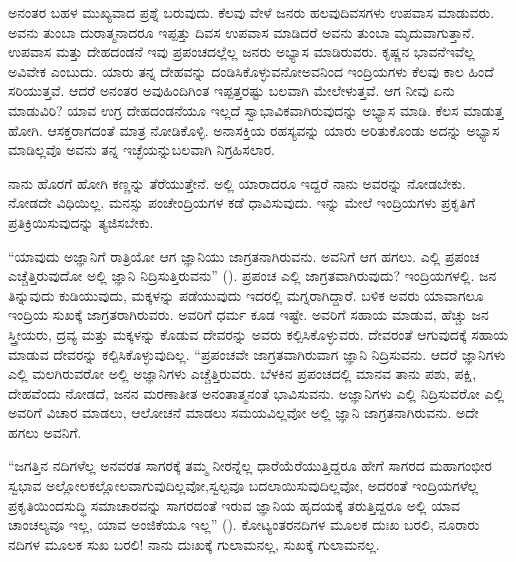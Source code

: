 ಅನಂತರ ಬಹಳ ಮುಖ್ಯವಾದ ಪ್ರಶ್ನೆ ಬರುವುದು. ಕೆಲವು ವೇಳೆ ಜನರು ಹಲವು\break ದಿವಸಗಳು ಉಪವಾಸ ಮಾಡುವರು. ಅವನು ತುಂಬಾ ದುರಾತ್ಮನಾದರೂ ಇಪ್ಪತ್ತು ದಿವಸ ಉಪವಾಸ ಮಾಡಿದರೆ ಅವನು ತುಂಬಾ ಮೃದುವಾಗುತ್ತಾನೆ. ಉಪವಾಸ ಮತ್ತು ದೇಹದಂಡನೆ ಇವು ಪ್ರಪಂಚದಲ್ಲೆಲ್ಲ ಜನರು ಅಭ್ಯಾಸ ಮಾಡಿರುವರು. ಕೃಷ್ಣನ ಭಾವನೆ\break ಇವೆಲ್ಲ ಅವಿವೇಕ ಎಂಬುದು. ಯಾರು ತನ್ನ ದೇಹವನ್ನು ದಂಡಿಸಿಕೊಳ್ಳುವನೋ\break ಅವನಿಂದ ಇಂದ್ರಿಯಗಳು ಕೆಲವು ಕಾಲ ಹಿಂದೆ ಸರಿಯುತ್ತವೆ. ಆದರೆ ಅನಂತರ ಅವು\break ಹಿಂದಿಗಿಂತ ಇಪ್ಪತ್ತರಷ್ಟು ಬಲವಾಗಿ ಮೇಲೇಳುತ್ತವೆ. ಆಗ ನೀವು ಏನು ಮಾಡುವಿರಿ? ಯಾವ ಉಗ್ರ ದೇಹದಂಡನೆಯೂ ಇಲ್ಲದೆ ಸ್ವಾಭಾವಿಕವಾಗಿರುವುದನ್ನು ಅಭ್ಯಾಸ ಮಾಡಿ. ಕೆಲಸ ಮಾಡುತ್ತ ಹೋಗಿ. ಆಸಕ್ತರಾಗದಂತೆ ಮಾತ್ರ ನೋಡಿಕೊಳ್ಳಿ. ಅನಾಸಕ್ತಿಯ ರಹಸ್ಯವನ್ನು ಯಾರು ಅರಿತುಕೊಂಡು ಅದನ್ನು ಅಭ್ಯಾಸ ಮಾಡಿಲ್ಲವೊ ಅವನು ತನ್ನ ಇಚ್ಛೆಯನ್ನು\break ಬಲವಾಗಿ ನಿಗ್ರಹಿಸಲಾರ.

ನಾನು ಹೊರಗೆ ಹೋಗಿ ಕಣ್ಣನ್ನು ತೆರೆಯುತ್ತೇನೆ. ಅಲ್ಲಿ ಯಾರಾದರೂ ಇದ್ದರೆ ನಾನು ಅವರನ್ನು ನೋಡಬೇಕು. ನೋಡದೇ ವಿಧಿಯಿಲ್ಲ. ಮನಸ್ಸು ಪಂಚೇಂದ್ರಿಯಗಳ ಕಡೆ ಧಾವಿಸುವುದು. ಇನ್ನು ಮೇಲೆ ಇಂದ್ರಿಯಗಳು ಪ್ರಕೃತಿಗೆ ಪ್ರತಿಕ್ರಿಯಿಸುವುದನ್ನು ತ್ಯಜಿಸಬೇಕು.

“ಯಾವುದು ಅಜ್ಞಾನಿಗೆ ರಾತ್ರಿಯೋ ಆಗ ಜ್ಞಾನಿಯು ಜಾಗ್ರತನಾಗಿರುವನು. ಅವನಿಗೆ ಆಗ ಹಗಲು. ಎಲ್ಲಿ ಪ್ರಪಂಚ ಎಚ್ಚೆತ್ತಿರುವುದೋ ಅಲ್ಲಿ ಜ್ಞಾನಿ ನಿದ್ರಿಸುತ್ತಿರುವನು” (). ಪ್ರಪಂಚ ಎಲ್ಲಿ ಜಾಗ್ರತವಾಗಿರುವುದು? ಇಂದ್ರಿಯಗಳಲ್ಲಿ. ಜನ ತಿನ್ನುವುದು ಕುಡಿಯುವುದು, ಮಕ್ಕಳನ್ನು ಪಡೆಯುವುದು ಇದರಲ್ಲಿ ಮಗ್ನರಾಗಿದ್ದಾರೆ. ಬಳಿಕ ಅವರು ಯಾವಾಗಲೂ ಇಂದ್ರಿಯ ಸುಖಕ್ಕೆ ಜಾಗ್ರತರಾಗಿರುವರು. ಅವರಿಗೆ ಧರ್ಮ ಕೂಡ ಇಷ್ಟೇ. ಅವರಿಗೆ ಸಹಾಯ ಮಾಡುವ, ಹೆಚ್ಚು ಜನ ಸ್ತ್ರೀಯರು, ದ್ರವ್ಯ ಮತ್ತು ಮಕ್ಕಳನ್ನು ಕೊಡುವ ದೇವರನ್ನು ಅವರು ಕಲ್ಪಿಸಿಕೊಳ್ಳುವರು. ದೇವರಂತೆ ಆಗುವುದಕ್ಕೆ ಸಹಾಯ ಮಾಡುವ ದೇವರನ್ನು ಕಲ್ಪಿಸಿಕೊಳ್ಳುವುದಿಲ್ಲ. “ಪ್ರಪಂಚವೇ ಜಾಗ್ರತವಾಗಿರುವಾಗ ಜ್ಞಾನಿ ನಿದ್ರಿಸುವನು. ಆದರೆ ಜ್ಞಾನಿಗಳು ಎಲ್ಲಿ ಮಲಗಿರುವರೋ ಅಲ್ಲಿ ಅಜ್ಞಾನಿಗಳು ಎಚ್ಚೆತ್ತಿರುವರು. ಬೆಳಕಿನ ಪ್ರಪಂಚದಲ್ಲಿ ಮಾನವ ತಾನು ಪಶು, ಪಕ್ಷಿ, ದೇಹವೆಂದು ನೋಡದೆ, ಜನನ ಮರಣಾತೀತ ಅನಂತಾತ್ಮನಂತೆ ಭಾವಿಸುವನು. ಅಜ್ಞಾನಿಗಳು ಎಲ್ಲಿ ನಿದ್ರಿಸುವರೋ ಎಲ್ಲಿ ಅವರಿಗೆ ವಿಚಾರ ಮಾಡಲು, ಆಲೋಚನೆ ಮಾಡಲು ಸಮಯವಿಲ್ಲವೋ ಅಲ್ಲಿ ಜ್ಞಾನಿ ಜಾಗ್ರತನಾಗಿರುವನು. ಅದೇ ಹಗಲು ಅವನಿಗೆ.

“ಜಗತ್ತಿನ ನದಿಗಳೆಲ್ಲ ಅನವರತ ಸಾಗರಕ್ಕೆ ತಮ್ಮ ನೀರನ್ನೆಲ್ಲ ಧಾರೆಯೆರೆಯುತ್ತಿದ್ದರೂ ಹೇಗೆ ಸಾಗರದ ಮಹಾಗಂಭೀರ ಸ್ವಭಾವ ಅಲ್ಲೋಲಕಲ್ಲೋಲವಾಗುವುದಿಲ್ಲವೋ,\break ಸ್ವಲ್ಪವೂ ಬದಲಾಯಿಸುವುದಿಲ್ಲವೋ, ಅದರಂತೆ ಇಂದ್ರಿಯಗಳೆಲ್ಲ ಪ್ರಕೃತಿಯಿಂದ\break ಸುದ್ಧಿ ಸಮಾಚಾರವನ್ನು ಸಾಗರದಂತೆ ಇರುವ ಜ್ಞಾನಿಯ ಹೃದಯಕ್ಕೆ ತರುತ್ತಿದ್ದರೂ ಅಲ್ಲಿ ಯಾವ ಚಾಂಚಲ್ಯವೂ ಇಲ್ಲ, ಯಾವ ಅಂಜಿಕೆಯೂ ಇಲ್ಲ” (). ಕೋಟ್ಯಂತರ\break ನದಿಗಳ ಮೂಲಕ ದುಃಖ ಬರಲಿ, ನೂರಾರು ನದಿಗಳ ಮೂಲಕ ಸುಖ ಬರಲಿ! ನಾನು ದುಃಖಕ್ಕೆ ಗುಲಾಮನಲ್ಲ, ಸುಖಕ್ಕೆ ಗುಲಾಮನಲ್ಲ.

